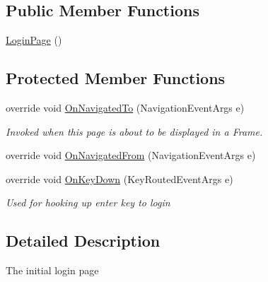 \subsection*{Public Member Functions}
\begin{DoxyCompactItemize}
\item 
\hyperlink{class_field_service_1_1_win_r_t_1_1_views_1_1_login_page_a4604ee8b4d9031b711a3c6d06ce45222}{Login\+Page} ()
\end{DoxyCompactItemize}
\subsection*{Protected Member Functions}
\begin{DoxyCompactItemize}
\item 
override void \hyperlink{class_field_service_1_1_win_r_t_1_1_views_1_1_login_page_ae98f673114190c837924da69715d0c46}{On\+Navigated\+To} (Navigation\+Event\+Args e)
\begin{DoxyCompactList}\small\item\em Invoked when this page is about to be displayed in a Frame. \end{DoxyCompactList}\item 
override void \hyperlink{class_field_service_1_1_win_r_t_1_1_views_1_1_login_page_afc278ebe46f569194be6bec2b88a78e8}{On\+Navigated\+From} (Navigation\+Event\+Args e)
\item 
override void \hyperlink{class_field_service_1_1_win_r_t_1_1_views_1_1_login_page_a0ddce1f9a7a9e40a677338521e9f7ee6}{On\+Key\+Down} (Key\+Routed\+Event\+Args e)
\begin{DoxyCompactList}\small\item\em Used for hooking up enter key to login \end{DoxyCompactList}\end{DoxyCompactItemize}


\subsection{Detailed Description}
The initial login page 



